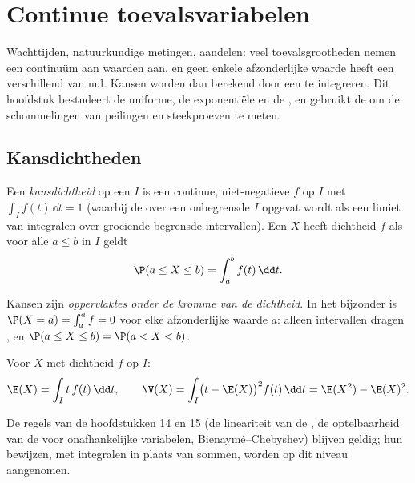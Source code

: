 \chapter{Continue toevalsvariabelen}\label{ch:g12:contdist}

Wachttijden, natuurkundige metingen, aandelen: veel toevalsgrootheden nemen
een continuüm aan waarden aan, en geen enkele afzonderlijke waarde heeft een
 verschillend van nul. Kansen worden dan berekend door een
\emph{} te integreren. Dit hoofdstuk bestudeert de uniforme, de
exponentiële en de , en gebruikt de  om de
schommelingen van peilingen en steekproeven te meten.

\section{Kansdichtheden}

\begin{definition}\label{def:g12:contdist:density}
Een \emph{kansdichtheid} op een  $I$ is een
continue, niet-negatieve  $f$ op $I$ met $\int_I f(t)\,\dd t = 1$
(waarbij de  over een onbegrensde $I$ opgevat wordt als een limiet
van integralen over groeiende begrensde intervallen). Een  $X$
heeft dichtheid $f$ als voor alle $a \leq b$ in $I$ geldt
\[
\P(a \leq X \leq b) = \int_a^b f(t)\,\dd t .
\]
\end{definition}

Kansen zijn \emph{oppervlaktes onder de kromme van de dichtheid}. In het
bijzonder is $\P(X = a) = \int_a^a f = 0$ voor elke afzonderlijke waarde $a$:
alleen intervallen dragen , en $\P(a \leq X \leq b) = \P(a < X < b)$.

\begin{definition}\label{def:g12:contdist:exp}
Voor $X$ met dichtheid $f$ op $I$:
\[
\E(X) = \int_I t\,f(t)\,\dd t, \qquad
\V(X) = \int_I \bigl(t - \E(X)\bigr)^2 f(t)\,\dd t
= \E(X^2) - \E(X)^2 .
\]
\end{definition}

De regels van de hoofdstukken 14 en 15 (de lineariteit van de
, de optelbaarheid van de  voor onafhankelijke
variabelen, Bienaymé--Chebyshev) blijven geldig; hun bewijzen, met integralen
in plaats van sommen, worden op dit niveau aangenomen.

